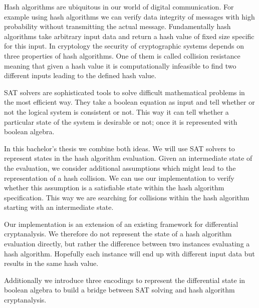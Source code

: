 Hash algorithms are ubiquitous in our world of digital communication.
For example using hash algorithms we can verify data integrity of messages
with high probability without transmitting the actual message. Fundamentally
hash algorithms take arbitrary input data and return a hash value of fixed
size specific for this input. In cryptology the security of cryptographic
systems depends on three properties of hash algorithms. One of them is called
collision resistance meaning that given a hash value it is computationally
infeasible to find two different inputs leading to the defined hash value.

SAT solvers are sophisticated tools to solve difficult mathematical problems
in the most efficient way. They take a boolean equation as input and tell
whether or not the logical system is consistent or not. This way it can tell
whether a particular state of the system is desirable or not; once it is
represented with boolean algebra.

In this bachelor's thesis we combine both ideas. We will use SAT solvers to
represent states in the hash algorithm evaluation. Given an intermediate
state of the evaluation, we consider additional assumptions which might
lead to the representation of a hash collision. We can use our implementation
to verify whether this assumption is a satisfiable state within the hash algorithm
specification. This way we are searching for collisions within the hash
algorithm starting with an intermediate state.

Our implementation is an extension of an existing framework for differential
cryptanalysis. We therefore do not represent the state of a hash algorithm
evaluation directly, but rather the difference between two instances evaluating
a hash algorithm. Hopefully each instance will end up with different input data
but results in the same hash value.

Additionally we introduce three encodings to represent the differential state
in boolean algebra to build a bridge between SAT solving and hash algorithm
cryptanalysis.
